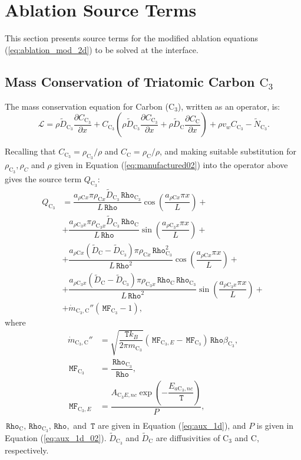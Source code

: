 \documentclass[10pt]{article}
\newcommand{\diff}[2] {\dfrac{\partial #1 }{\partial #2}}
\newcommand{\Lo}{\,\mathcal{L}}
\newcommand{\Rho}{\,\mathtt{Rho}}
\newcommand{\T}{\,\mathtt{T}}
\newcommand{\MF}{\,\mathtt{MF}}
\newcommand{\C}{\text{C}}
\begin{document}
\section{Ablation Source Terms}


This section presents source terms for the modified ablation equations  (\ref{eq:ablation_mod_2d}) to be solved at the interface.


\subsection{Mass Conservation of Triatomic Carbon $\C_3$}

The mass conservation equation for Carbon (C$_3$), written as an operator, is:
\begin{equation*}
 \Lo =  \rho \tilde{D}_{\C_3} \diff{C_{\C_3}}{x}+ C_{\C_3} \left(\rho \tilde{D}_{\C_3} \diff{C_{\C_3}}{x}+\rho \tilde{D}_\C \diff{C_\C}{x}\right)+\rho v_w C_{\C_3}-\tilde{N}_{\C_3}.
\end{equation*}


Recalling that $C_{\C_3}=\rho_{\C_3}/\rho$ and $C_{\C}=\rho_{\C}/\rho$, and making suitable substitution for $\rho_{\C_3},\rho_{C}$ and $\rho$ given in Equation (\ref{eq:manufactured02}) into the operator above gives the source term $Q_{\C_3}$:
\begin{equation}
 \begin{split}
  Q_{\C_3} &= \dfrac{a_{\rho \C x} \pi \rho_{\C x} \tilde{D}_{\C_3} \Rho_{\C_3}  }{L\Rho}\cos\left(\dfrac{a_{\rho \C x} \pi x}{L}\right)+\\
&+ \dfrac{a_{\rho \C_3 x} \pi \rho_{\C_3 x} \tilde{D}_{\C_3} \Rho_{\C} }{L\Rho}  \sin\left(\dfrac{a_{\rho \C_3 x} \pi x}{L}\right)+\\
&+ \dfrac{a_{\rho \C x} (\tilde{D}_{\C}-\tilde{D}_{\C_3}) \pi \rho_{\C x} \Rho_{\C_3}^2  }{L\Rho^2}\cos\left(\dfrac{a_{\rho \C x} \pi x}{L}\right)+\\
&+ \dfrac{a_{\rho \C_3 x} (\tilde{D}_{\C}-\tilde{D}_{\C_3}) \pi \rho_{\C_3 x} \Rho_{\C} \Rho_{\C_3}  }{L\Rho^2} \sin\left(\dfrac{a_{\rho \C_3 x} \pi x}{L}\right)+\\
&+ \dot{m}_{\C_3,\C}'' (\MF_{\C_3}-1), 
 \end{split}
\end{equation}
%
where 
\begin{equation}
 \begin{split}\label{eq:aux_1d_03}
\dot{m}_{\C_3,\C}''&= \sqrt{\dfrac{\T k_B}{2\pi m_{\C_3}}}  (\MF_{\C_3,E}-\MF_{\C_3}) \Rho \beta_{\C_3},\\
\MF_{\C_3}&=\dfrac{\Rho_{\C_3}}{\Rho},\\
\MF_{\C_3,E} &= \dfrac{A_{\C_3 E, nc} \exp\left(-\dfrac{E_{a\C_3, nc}}{\T} \right) }{P},\\
 \end{split}
\end{equation}
 $\Rho_\C, \Rho_{\C_3}, \Rho,$ and $ \T$ are given in Equation (\ref{eq:aux_1d}), and $P$ is given in Equation (\ref{eq:aux_1d_02}). $\tilde{D}_{\C_3}$ and $\tilde{D}_{\C}$ are diffusivities of $\C_3$ and C, respectively.
\end{document}
